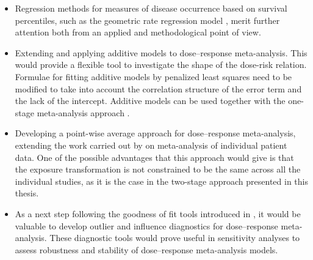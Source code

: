\begin{itemize}
\item Regression methods for measures of disease occurrence based on survival percentiles, such as the geometric rate regression model \citep{bottai_regression_2015}, merit further attention both from an applied and methodological point of view.

\item Extending and applying additive models \citep{buja_linear_1989} to dose--response meta-analysis. This would provide  a flexible tool to investigate the shape of the dose-risk relation. Formulae for fitting additive models by penalized least squares need to be modified to take into account the correlation structure of the error term and  the lack of the intercept. Additive models can be used together with the one-stage meta-analysis approach .

\item Developing a point-wise average approach for dose--response meta-analysis, extending the work carried out by \citet{sauerbrei_new_2011} on meta-analysis of individual patient data. One of the possible advantages that this approach would give is that the exposure transformation is not constrained to be the same across all the individual studies, as it is the case in the two-stage approach presented in this thesis. 

\item As a next step following the goodness of fit tools introduced in , it would be valuable to develop outlier and influence diagnostics for dose--response meta-analysis. These diagnostic tools would prove useful in sensitivity analyses to assess robustness and stability of dose--response meta-analysis models. 

\end{itemize}